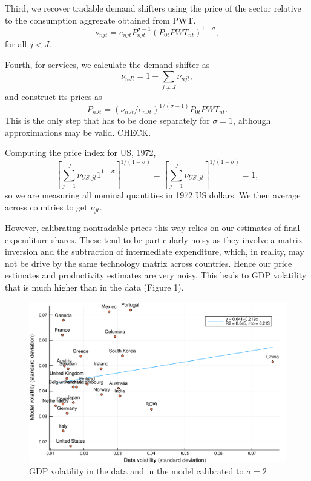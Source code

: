 \documentclass[12pt]{article}
\begin{document}
Third, we recover tradable demand shifters using the price of the sector relative to the consumption aggregate obtained from PWT.
\[
\nu_{njt} = e_{njt} P_{njt}^{\sigma-1} (P_{0t}PWT_{nt})^{1-\sigma},
\]
for all $j<J$.

Fourth, for services, we calculate the demand shifter as 
\[
\nu_{nJt} = 1-\sum_{j\neq J}\nu_{njt},
\]
and construct its prices as
\[
P_{nJt} = (\nu_{nJt}/e_{nJt})^{1/(\sigma-1)} P_{0t}PWT_{nt}.
\]
This is the only step that has to be done separately for $\sigma=1$, although approximations may be valid. CHECK.

Computing the price index for US, 1972,
\begin{equation}
	\left[\sum_{j=1}^J \nu_{US,jt} 1^{1-\sigma}\right]^{1/(1-\sigma)} = 
	\left[\sum_{j=1}^J \nu_{US,jt}\right]^{1/(1-\sigma)}
 =1,
\end{equation}
so we are measuring all nominal quantities in 1972 US dollars. We then average across countries to get $\nu_{jt}$.

However, calibrating nontradable prices this way relies on our estimates of final expenditure shares. These tend to be particularly noisy as they involve a matrix inversion and the subtraction of intermediate expenditure, which, in reality, may not be drive by the same technology matrix across countries. Hence our price estimates and productivity estimates are very noisy. This leads to GDP volatility that is much higher than in the data (Figure 1).

\begin{figure}
\includegraphics[width=\linewidth]{CES2-model-data.pdf}
\caption{GDP volatility in the data and in the model calibrated to $\sigma=2$}
\end{figure}
\end{document}
